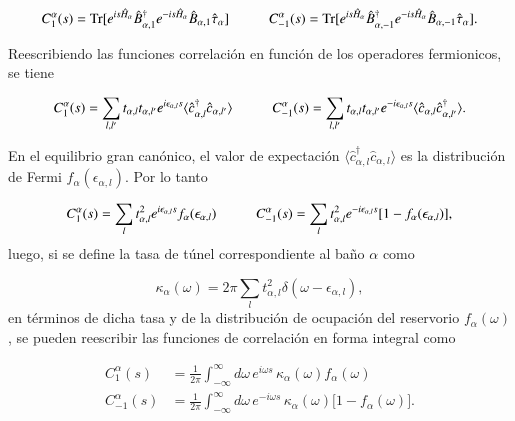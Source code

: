 \begin{appendixs}
\begin{equation*}
    C_{1}^{\alpha}(s) = \text{Tr}[e^{is\hat{H}_{\alpha}}\hat{B}^{\dagger}_{\alpha,1}e^{-is\hat{H}_{\alpha}}\hat{B}_{\alpha,1}\hat{\tau}_{\alpha}  ]  \hspace{10mm} C_{-1}^{\alpha}(s) = \text{Tr}[e^{is\hat{H}_{\alpha}}\hat{B}^{\dagger}_{\alpha,-1}e^{-is\hat{H}_{\alpha}}\hat{B}_{\alpha,-1}\hat{\tau}_{\alpha}  ]. 
\end{equation*}

Reescribiendo las funciones correlación en función de los operadores fermionicos, se tiene

\begin{equation*}
    C_{1}^{\alpha}(s) = \sum_{l,l'}t_{\alpha,l}t_{\alpha,l'}e^{i\epsilon_{\alpha,l}s} \langle \hat{c}^{\dagger}_{\alpha,l}\hat{c}_{\alpha,l'} \rangle \hspace{10mm} C
    ^{\alpha}_{-1}(s) = \sum_{l,l'}t_{\alpha,l}t_{\alpha,l'}e^{-i\epsilon_{\alpha,l}s} \langle \hat{c}_{\alpha,l}\hat{c}^{\dagger}_{\alpha,l'} \rangle.
\end{equation*}

En el equilibrio gran canónico, el valor de expectación $\langle \hat{c}^{\dagger}_{\alpha,l}\hat{c}_{\alpha,l}\rangle$ es la distribución de Fermi $f_{\alpha}(\epsilon_{\alpha,l})$. Por lo tanto  

\begin{equation*}
    C_{1}^{\alpha}(s) = \sum_{l}t^{2}_{\alpha,l}e^{i\epsilon_{\alpha,l}s} f_{\alpha}(\epsilon_{\alpha,l}) \hspace{10mm} C
    ^{\alpha}_{-1}(s) = \sum_{l}t^{2}_{\alpha,l}e^{-i\epsilon_{\alpha,l}s} [1-f_{\alpha}(\epsilon_{\alpha,l})],
\end{equation*}
luego, si se define la tasa de túnel correspondiente al baño \( \alpha \) como

\begin{equation*}
    \kappa_{\alpha}(\omega) = 2\pi \sum_{l} t_{\alpha,l}^{2} \delta(\omega - \epsilon_{\alpha,l}),
\end{equation*}
en términos de dicha tasa y de la distribución de ocupación del reservorio \( f_\alpha(\omega) \), se pueden reescribir las funciones de correlación en forma integral como

\begin{align*}
    C_{1}^{\alpha}(s) &= \frac{1}{2\pi} \int_{-\infty}^{\infty} d\omega\, e^{i\omega s}\, \kappa_{\alpha}(\omega) f_{\alpha}(\omega) \\
    C_{-1}^{\alpha}(s) &= \frac{1}{2\pi} \int_{-\infty}^{\infty} d\omega\, e^{-i\omega s}\, \kappa_{\alpha}(\omega)\big[1 - f_{\alpha}(\omega)\big].
\end{align*}


\end{appendixs}
